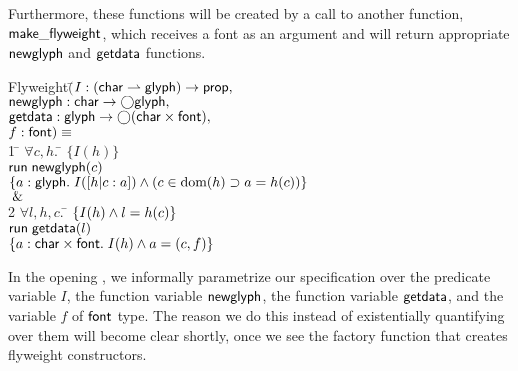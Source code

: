 Furthermore, these functions will be created by a call to another
function, $\mathsf{make\_flyweight}$, which receives a font as an
argument and will return appropriate $\mathsf{newglyph}$ and
$\mathsf{getdata}$ functions.

\begin{tabbing}
Flyweight$($\=$I : (\mathsf{char} \rightharpoonup \mathsf{glyph}) \to \mathsf{prop},\;\; $\\
\> $\mathsf{newglyph} : \mathsf{char} \to \bigcirc{\mathsf{glyph}},$ \\
\> $\mathsf{getdata} : \mathsf{glyph} \to \bigcirc{(\mathsf{char}\times \mathsf{font})},$ \\
\> $f:\mathsf{font}) \equiv$ \\

1 \qquad\=  $\forall$\=$c, h.\;$\=
         $\{I(h)\}$ \\
  \>\>\>$\mathsf{run}\;{\mathsf{newglyph}(c)}$ \\
  \>\>\>$\{{a:\mathsf{glyph}.\; I([h|c:a]) \land (c \in \mbox{dom}({h}) \supset a = h(c))}\}$ \\
  \> \!$\;\&\;$ \\
2 \> $\forall l, h, c.\;$\=
     $\{{I(h) \land l = h(c)}\}$ \\
\>\> $\mathsf{run}\;{\mathsf{getdata}(l)}$ \\
\>\> $\{{a:\mathsf{char} \times \mathsf{font}.\;  I(h) \land a = (c,f)}\}$
% 
\end{tabbing}


In the opening , we informally parametrize our specification over the
predicate variable $I$, the function variable $\mathsf{newglyph}$, the
function variable $\mathsf{getdata}$, and the variable $f$ of $\mathsf{font}$
type. The reason we do this instead of existentially quantifying over
them will become clear shortly, once we see the factory function that
creates flyweight constructors.

